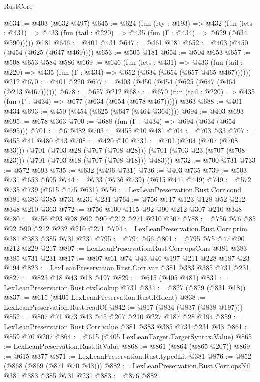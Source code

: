 \begin{lexlean}{RustCore}
\begin{coremodule}
@634 := @403 (@632 @497)
@645 := @624
    (fun (rty : @193) =>
    @432
      (fun (lets : @431) => @433 (fun (tail : @220) => @435 (fun (Γ : @434) => @629 (@634 @590)))))
    @181
@646 := @401 @431
@647 := @461 @181
@652 := @403 (@450 (@454 (@625 (@647 @469))))
@653 := @505 @181
@654 := @504 @653
@657 := @508 @653 @584 @586
@669 := @646
    (fun (lets : @431) =>
    @433 (fun (tail : @220) => @435 (fun (Γ : @434) => @652 (@634 (@654 (@657 @465 @467))))))
    @212
@670 := @401 @220
@677 := @403 (@450 (@454 (@625 (@647 (@464 (@213 @467))))))
@678 := @657 @212
@687 := @670 (fun (tail : @220) => @435 (fun (Γ : @434) => @677 (@634 (@654 (@678 @467))))) @363
@688 := @401 @434
@693 := @450 (@454 (@625 (@647 (@464 @364))))
@694 := @403 @693
@695 := @678 @363
@700 := @688 (fun (Γ : @434) => @694 (@634 (@654 @695)))
@701 := @6 @482
@703 := @455 @10 @481
@704 := @703 @33
@707 := @455 @41 @480 @43
@708 := @420 @10
@731 := @701
    (@704 (@707 (@708 @33)))
    (@701
      (@703 @28 (@707 (@708 @28)))
      (@701 (@703 @23 (@707 (@708 @23))) (@701 (@703 @18 (@707 (@708 @18))) @483)))
@732 := @700 @731
@733 := @572 @693
@735 := @632 (@496 @731)
@736 := @403 @735
@739 := @503 @731 @653 @695
@744 := @733 (@736 @739) (@615 @441 @449)
@749 := @572 @735 @739 (@615 @475 @631)
@756 := LexLeanPreservation.Rust.Corr.cond @381 @383 @385 @731 @231 @231
@764 := @756 @117 @123 @128 @52 @212 @348 @210 @363
@772 := @756 @100 @115 @92 @90 @212 @307 @210 @348
@780 := @756 @93 @98 @92 @90 @212 @271 @210 @307
@788 := @756 @76 @85 @92 @90 @212 @232 @210 @271
@794 := LexLeanPreservation.Rust.Corr.prim @381 @383 @385 @731 @231
@795 := @794 @56
@801 := @795 @75 @47 @90 @212 @229 @217
@807 := LexLeanPreservation.Rust.Corr.opsCons @381 @383 @385 @731 @231
@817 := @807 @61 @74 @43 @46 @197 @211 @228 @187 @23 @194
@823 := LexLeanPreservation.Rust.Corr.var @381 @383 @385 @731 @231
@827 := @823 @18 @43 @18 @197
@829 := @615 (@405 @481)
@831 := LexLeanPreservation.Rust.ctxLookup @731
@834 := @827 (@829 (@831 @18))
@837 := @615 (@405 LexLeanPreservation.Rust.RIdent)
@838 := LexLeanPreservation.Rust.readOf
@842 := @817 (@834 (@837 (@838 @197)))
@852 := @807 @71 @73 @43 @45 @207 @210 @227 @187 @28 @194
@859 := LexLeanPreservation.Rust.Corr.value @381 @383 @385 @731 @231 @43
@861 := @859 @70 @207
@864 := @615 (@405 LexLeanTarget.TargetSyntax.Value)
@865 := LexLeanPreservation.Rust.litValue
@868 := @861 (@864 (@865 @207))
@869 := @615 @377
@871 := LexLeanPreservation.Rust.typedLit @381
@876 := @852 (@868 (@869 (@871 @70 @43)))
@882 := LexLeanPreservation.Rust.Corr.opsNil @381 @383 @385 @731 @231
@883 := @876 @882

\end{coremodule}
\end{lexlean}
